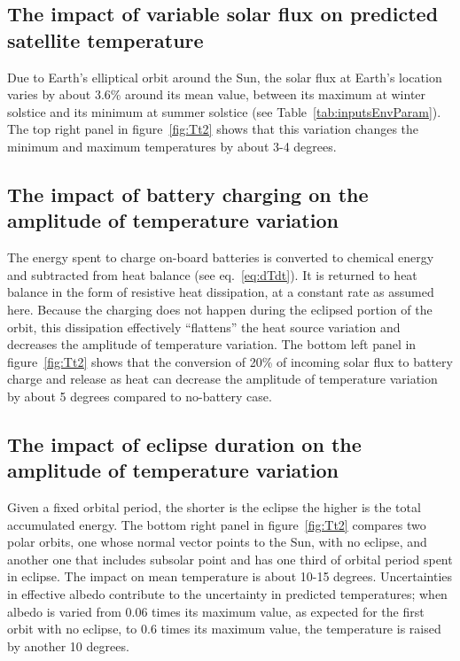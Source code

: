 \documentclass[]{aastex62}
\begin{document}
\subsection{The impact of  variable solar flux on predicted satellite temperature} 

Due to Earth's elliptical orbit around the Sun, the solar flux at Earth's location varies by about 3.6\%
around its mean value, between its maximum at winter solstice and its minimum at summer solstice
(see Table~\ref{tab:inputsEnvParam}). The top right panel in figure~\ref{fig:Tt2} shows that this 
variation changes the minimum and maximum temperatures by about 3-4 degrees. 

 
\subsection{The impact of  battery charging on the amplitude of temperature variation} 

The energy spent to charge on-board batteries is converted to chemical energy and subtracted
from heat balance (see eq.~\ref{eq:dTdt}). It is returned to heat balance in the form of resistive
heat dissipation, at a constant rate as assumed here. Because the charging does not happen 
during the eclipsed portion of the orbit, this dissipation effectively ``flattens'' the heat source 
variation and decreases the amplitude of temperature variation. The bottom left panel in 
figure~\ref{fig:Tt2} shows that the conversion of 20\% of incoming solar flux to battery charge
and release as heat can decrease the amplitude of temperature variation by about 5 degrees
compared to no-battery case. 
 

\subsection{The impact of  eclipse duration on the amplitude of temperature variation} 

Given a fixed orbital period, the shorter is the eclipse the higher is the total accumulated
energy. The bottom right panel in figure~\ref{fig:Tt2} compares two polar orbits, one whose 
normal vector points to the Sun, with no eclipse, and another one that includes subsolar point
and has one third of orbital period spent in eclipse. The impact on mean temperature is about 
10-15 degrees. Uncertainties in effective albedo contribute to the uncertainty in predicted
temperatures; when
albedo is varied from 0.06 times its maximum value, as expected for the first orbit with
no eclipse, to 0.6 times its maximum value, the temperature is raised by another 10 degrees.
\end{document}
